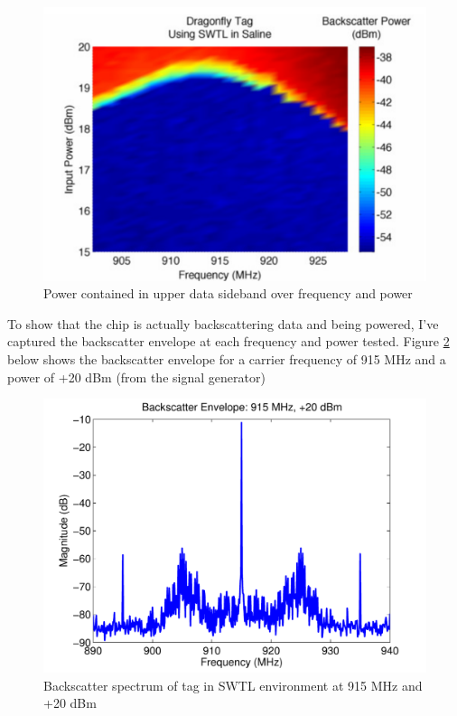 \documentclass[12pt,onecolumn,titlepage]{article}
\begin{document}
\begin{figure}[htbp]
	\centering
	\includegraphics[width=\textwidth]{Pictures/25June2013/SWTL_w_tag_USB_pwr}
	\caption{ Power contained in upper data sideband over frequency and power } 
	\label{fig:SWTL_w_tag_USB_pwr}
\end{figure}



To show that the chip is actually backscattering data and being powered, I've captured the backscatter envelope at each frequency and power tested. Figure \ref{fig:BS_env_915MHz_20dBm} below shows the backscatter envelope for a carrier frequency of 915 MHz and a power of +20 dBm (from the signal generator)


\begin{figure}[htbp]
	\centering
	\includegraphics[width=\textwidth]{Pictures/25June2013/BS_env_915MHz_20dBm}
	\caption{ Backscatter spectrum of tag in SWTL environment at 915 MHz and +20 dBm } 
	\label{fig:BS_env_915MHz_20dBm}
\end{figure}
\end{document}
